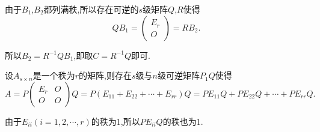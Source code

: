 \documentclass{article}
\begin{document}
 由于$B_1$,$B_2$都列满秩,所以存在可逆的$s$级矩阵$Q$,$R$使得
\begin{equation*}
    Q B_{1}=\left(\begin{array}{c}
            E_{r} \\
            O
        \end{array}\right)=R B_{2}.
\end{equation*}

所以$B_2 = R^{-1}QB_1$,即取$C = R^{-1}Q$即可.


 

设$A_{s \times n}$是一个秩为$r$的矩阵,则存在$s$级与$n$级可逆矩阵$P_1Q$使得
\begin{equation*}
    A=P\left(\begin{array}{cc}
            E_{r} & O \\
            O     & O
        \end{array}\right) Q=P\left(E_{11}+E_{22}+\cdots+E_{r r}\right) Q=P E_{11} Q+P E_{22} Q+\cdots+P E_{r r} Q.
\end{equation*}

由于$E_{i i} \left(i = 1,2, \cdots , r\right)$的秩为1,所以$PE_{i i}Q$的秩也为1.

 
\end{document}
